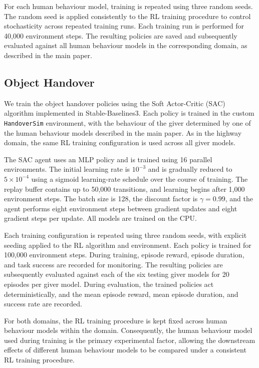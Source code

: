\documentclass[journal]{IEEEtran}
\begin{document}
For each human behaviour model, training is repeated using three random seeds. The random seed is applied consistently to the RL training procedure to control stochasticity across repeated training runs. Each training run is performed for 40{,}000 environment steps. The resulting policies are saved and subsequently evaluated against all human behaviour models in the corresponding domain, as described in the main paper.

\subsection{Object Handover}

We train the object handover policies using the Soft Actor-Critic (SAC) algorithm implemented in Stable-Baselines3. Each policy is trained in the custom \texttt{HandoverSim} environment, with the behaviour of the giver determined by one of the human behaviour models described in the main paper. As in the highway domain, the same RL training configuration is used across all giver models.

The SAC agent uses an MLP policy and is trained using 16 parallel environments. The initial learning rate is $10^{-3}$ and is gradually reduced to $5\times10^{-4}$ using a sigmoid learning-rate schedule over the course of training. The replay buffer contains up to 50{,}000 transitions, and learning begins after 1{,}000 environment steps. The batch size is 128, the discount factor is $\gamma=0.99$, and the agent performs eight environment steps between gradient updates and eight gradient steps per update. All models are trained on the CPU.

Each training configuration is repeated using three random seeds, with explicit seeding applied to the RL algorithm and environment. Each policy is trained for 100{,}000 environment steps. During training, episode reward, episode duration, and task success are recorded for monitoring. The resulting policies are subsequently evaluated against each of the six testing giver models for 20 episodes per giver model. During evaluation, the trained policies act deterministically, and the mean episode reward, mean episode duration, and success rate are recorded.

For both domains, the RL training procedure is kept fixed across human behaviour models within the domain. Consequently, the human behaviour model used during training is the primary experimental factor, allowing the downstream effects of different human behaviour models to be compared under a consistent RL training procedure.



\end{document}
